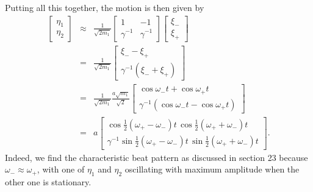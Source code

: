 \documentclass[letterpaper,11pt]{article}
\begin{document}
Putting all this together, the motion is then given by
\begin{eqnarray*}
 \left[ \begin{array}{c}
  \eta_1 \\
  \eta_2
 \end{array} \right] & \approx &
 \frac{1}{\sqrt{2 m_1}}
 \left[ \begin{array}{cc}
  1 & - 1 \\
  \gamma^{-1} & \gamma^{-1}
 \end{array} \right]
 \left[ \begin{array}{c}
  \xi_- \\
  \xi_+
 \end{array} \right] \\
 & = & 
 \frac{1}{\sqrt{2 m_1}}
 \left[ \begin{array}{c}
  \xi_- - \xi_+ \\
  \gamma^{-1} (\xi_- + \xi_+)
 \end{array} \right] \\
 & = & \frac{1}{\sqrt{2 m_1}} \frac{a\sqrt{m_1}}{\sqrt{2}}
 \left[ \begin{array}{c}
  \cos\omega_-t + \cos\omega_+t \\
  \gamma^{-1} (\cos\omega_-t - \cos\omega_+t)
 \end{array} \right] \\
 & = & 
 a
 \left[ \begin{array}{c}
  \cos\frac{1}{2}(\omega_+ - \omega_-)t \, \cos\frac{1}{2}(\omega_+ + \omega_-)t \\
  \gamma^{-1} \sin\frac{1}{2}(\omega_+ - \omega_-)t \, \sin\frac{1}{2}(\omega_+ + \omega_-)t
 \end{array} \right].
\end{eqnarray*}
Indeed, we find the characteristic beat pattern as discussed in section 23 because $\omega_- \approx \omega_+$, with one of $\eta_1$ and $\eta_2$ oscillating with maximum amplitude when the other one is stationary.
\end{document}
